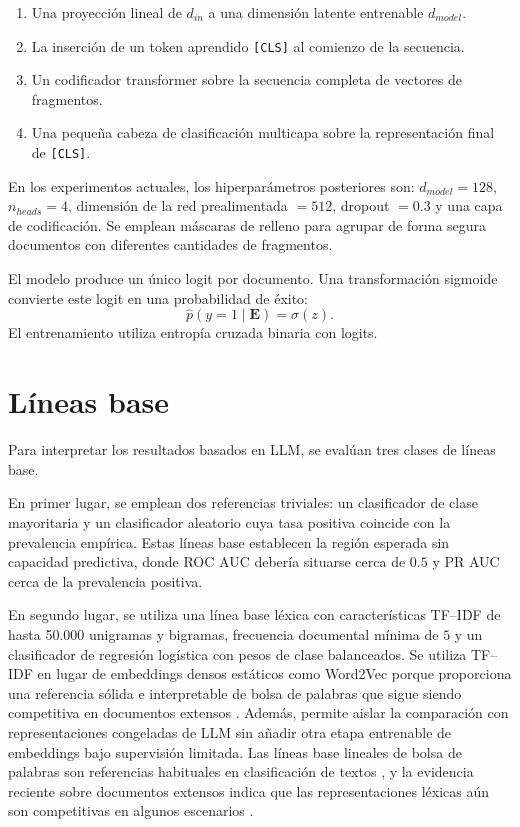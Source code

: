 \begin{enumerate}
  \item Una proyección lineal de $d_{in}$ a una dimensión latente entrenable $d_{model}$.
  \item La inserción de un token aprendido \texttt{[CLS]} al comienzo de la secuencia.
  \item Un codificador transformer sobre la secuencia completa de vectores de fragmentos.
  \item Una pequeña cabeza de clasificación multicapa sobre la representación final de \texttt{[CLS]}.
\end{enumerate}

En los experimentos actuales, los hiperparámetros posteriores son: $d_{model}=128$, $n_{heads}=4$, dimensión de la red prealimentada $=512$, dropout $=0.3$ y una capa de codificación. Se emplean máscaras de relleno para agrupar de forma segura documentos con diferentes cantidades de fragmentos.

El modelo produce un único logit por documento. Una transformación sigmoide convierte este logit en una probabilidad de éxito:
\[
\hat{p}(y=1 \mid \mathbf{E}) = \sigma(z).
\]
El entrenamiento utiliza entropía cruzada binaria con logits.

\section{Líneas base}
Para interpretar los resultados basados en LLM, se evalúan tres clases de líneas base.

En primer lugar, se emplean dos referencias triviales: un clasificador de clase mayoritaria y un clasificador aleatorio cuya tasa positiva coincide con la prevalencia empírica. Estas líneas base establecen la región esperada sin capacidad predictiva, donde ROC AUC debería situarse cerca de $0.5$ y PR AUC cerca de la prevalencia positiva.

En segundo lugar, se utiliza una línea base léxica con características TF--IDF de hasta 50.000 unigramas y bigramas, frecuencia documental mínima de $5$ y un clasificador de regresión logística con pesos de clase balanceados. Se utiliza TF--IDF en lugar de embeddings densos estáticos como Word2Vec porque proporciona una referencia sólida e interpretable de bolsa de palabras que sigue siendo competitiva en documentos extensos \cite{wang2012baselines,alvaprincipe2025survey}. Además, permite aislar la comparación con representaciones congeladas de LLM sin añadir otra etapa entrenable de embeddings bajo supervisión limitada. Las líneas base lineales de bolsa de palabras son referencias habituales en clasificación de textos \cite{wang2012baselines}, y la evidencia reciente sobre documentos extensos indica que las representaciones léxicas aún son competitivas en algunos escenarios \cite{alvaprincipe2025survey}.

